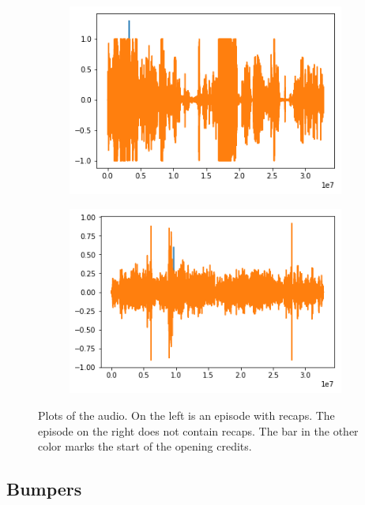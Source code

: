 \documentclass{article}
\begin{document}
\begin{figure}[H]
	\centering
	\begin{subfigure}[b]{0.4\textwidth}
		\includegraphics[width=\textwidth]{images/audio_recaps_true.png}
	\end{subfigure}
	\begin{subfigure}[b]{0.4\textwidth}
		\includegraphics[width=\textwidth]{images/audio_recaps_false.png}
	\end{subfigure}
	\caption{Plots of the audio. On the left is an episode with recaps. The episode on the right does not contain recaps. The bar in the other color marks the start of the opening credits.}
	\label{fig:closingcredits}
\end{figure}

\subsection{Bumpers}
\end{document}
